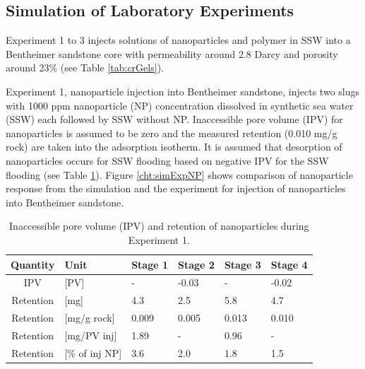 \documentclass[journal = enfuem, manuscript =  article]{achemso}
\begin{document}
\subsection{Simulation of Laboratory Experiments}
Experiment 1 to 3 injects solutions of nanoparticles and polymer in SSW into a Bentheimer sandstone core with permeability around 2.8 Darcy and porosity around 23\% (see Table \ref{tab:crGels}).

Experiment 1, nanoparticle injection into Bentheimer sandstone, injects two slugs with 1000 ppm nanoparticle (NP) concentration dissolved in synthetic sea water (SSW) each followed by SSW without NP. Inaccessible pore volume (IPV) for nanoparticles is assumed to be zero and the measured retention (0.010 mg/g rock) are taken into the adsorption isotherm. It is assumed that desorption of nanoparticles occurs for SSW flooding based on negative IPV for the SSW flooding (see Table \ref{tab:ipvexp1}). Figure \ref{cht:simExpNP} shows comparison of nanoparticle response from the simulation and the experiment for injection of nanoparticles into Bentheimer sandstone.

\begin{table} %
\small
\centering
\caption{Inaccessible pore volume (IPV) and retention of nanoparticles during Experiment 1.}
\label{tab:ipvexp1}
\begin{tabular}{c l l l l l } 
\toprule
\textbf{Quantity} & \textbf{Unit} & \textbf{Stage 1} & \textbf{Stage 2} & \textbf{Stage 3} & \textbf{Stage 4} \\ 
\midrule 
IPV         & [PV]          & -         & -0.03     & -         & -0.02     \\
Retention   & [mg]          & 4.3       & 2.5       & 5.8       & 4.7       \\ 
Retention   & [mg/g rock]   & 0.009     & 0.005     & 0.013     & 0.010     \\ 
Retention   & [mg/PV inj]   & 1.89      & -         & 0.96      & -         \\
Retention   & [\% of inj NP]& 3.6       & 2.0       & 1.8       & 1.5       \\ 
\bottomrule
\end{tabular}
\end{table}
\end{document}
